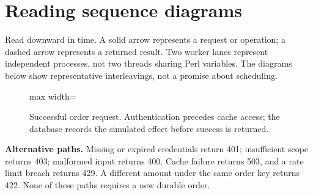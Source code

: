 \section{Reading sequence diagrams}
Read downward in time. A solid arrow represents a request or operation; a dashed arrow represents a returned result. Two worker lanes represent independent processes, not two threads sharing Perl variables. The diagrams below show representative interleavings, not a promise about scheduling.

\begin{figure}[H]\centering
\begin{adjustbox}{max width=\linewidth}
\end{adjustbox}
\caption{Successful order request. Authentication precedes cache access; the database records the simulated effect before success is returned.}
\end{figure}

\noindent\textbf{Alternative paths.} Missing or expired credentials return 401; insufficient scope returns 403; malformed input returns 400. Cache failure returns 503, and a rate limit breach returns 429. A different amount under the same order key returns 422. None of these paths requires a new durable order.

